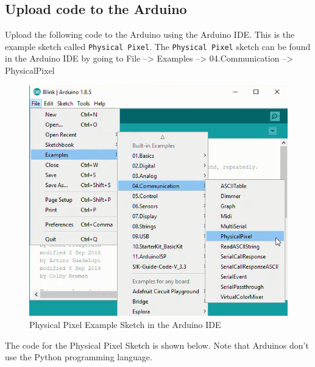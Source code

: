 \documentclass{book}
\makeatletter
\def\maxwidth{\ifdim\Gin@nat@width>\linewidth\linewidth
    \else\Gin@nat@width\fi}
\let\Oldincludegraphics\includegraphics
\renewcommand{\includegraphics}[1]{\Oldincludegraphics[width=.8\maxwidth]{#1}}
\makeatother
\begin{document}
    
        \subsection{Upload code to the
Arduino}\label{upload-code-to-the-arduino}
    




    
        Upload the following code to the Arduino using the Arduino IDE. This is
the example sketch called \lstinline!Physical Pixel!. The
\lstinline!Physical Pixel! sketch can be found in the Arduino IDE by
going to File --\textgreater{} Examples --\textgreater{}
04.Communication --\textgreater{} PhysicalPixel

\begin{figure}
\centering
\includegraphics{images/file-examples-communication-physicalpixel.png}
\caption{Physical Pixel Example Sketch in the Arduino IDE}
\end{figure}

The code for the Physical Pixel Sketch is shown below. Note that
Arduinos don't use the Python programming language.
    
\end{document}
